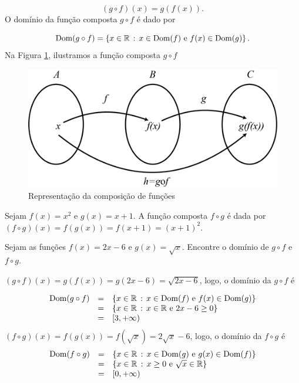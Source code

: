 \documentclass[../main.tex]{subfiles}
\begin{document}
\[ (g\circ f)(x)=g(f(x)). \]
O domínio da função composta \(g\circ f\) é dado por

\[ {\rm Dom}(g\circ f) = \left\{ x\in \mathbb{R}\,:\, x\in {\rm Dom}(f) \mbox{ e } f(x)\in{\rm Dom}(g) \right\}. \]
Na Figura \ref{fig:Compfunc}, ilustramos a função composta \(g\circ f\)
\begin{figure}[!htb]
    \centering
    \includegraphics[scale=0.8]{1-cap_func/fig_func/Repres-Funcao-composta.png}
    \caption{Representação da composição de funções}
    \label{fig:Compfunc}
\end{figure}

\begin{ex}
  Sejam $f(x) = x^2$ e $g(x) = x+1$. A função composta $f\circ g$ é dada por $(f\circ g)(x) = f(g(x)) = f(x+1) = (x+1)^2$.
\end{ex}

\begin{ex}
Sejam as funções \(f(x)=2x-6\) e \(g(x)=\sqrt{x}\). Encontre o domínio de \(g\circ f\) e \(f\circ g\).\\
\begin{solution}
\((g\circ f)(x)=g(f(x))= g\left(2x-6\right)=\sqrt{2x-6} \),
logo, o domínio da \(g\circ f\) é

\[ \begin{array}{rcl} {\rm Dom}(g\circ f) &=& \left\{ x\in \mathbb{R}\,:\, x\in {\rm Dom}(f) \mbox{ e } f(x)\in{\rm Dom}(g) \right\}\\ &=& \left\{ x\in \mathbb{R}\,:\, x\in \mathbb{R} \mbox{ e } 2x-6\geq 0 \right\}\\ &=& [3,+\infty) \end{array} \]
\((f\circ g)(x)=f(g(x))= f\left(\sqrt{x}\right)=2\sqrt{x}-6\),
logo, o domínio da \(f\circ g\) é
\[ \begin{array}{rcl} {\rm Dom}(f\circ g) &=& \left\{ x\in \mathbb{R}\,:\, x\in {\rm Dom}(g) \mbox{ e } g(x)\in{\rm Dom}(f) \right\}\\ &=& \left\{ x\in \mathbb{R}\,:\, x\geq 0 \mbox{ e } \sqrt{x}\in \mathbb{R} \right\}\\ &=& [0,+\infty) \end{array} \]
\end{solution}
\end{ex}
\end{document}
